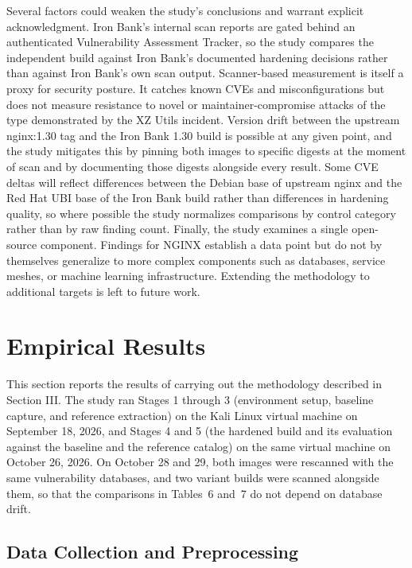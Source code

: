 \documentclass[10pt,letterpaper,twocolumn]{article}
\begin{document}
Several factors could weaken the study's conclusions and warrant explicit acknowledgment. Iron Bank's internal scan reports are gated behind an authenticated Vulnerability Assessment Tracker, so the study compares the independent build against Iron Bank's documented hardening decisions rather than against Iron Bank's own scan output. Scanner-based measurement is itself a proxy for security posture. It catches known CVEs and misconfigurations but does not measure resistance to novel or maintainer-compromise attacks of the type demonstrated by the XZ Utils incident. Version drift between the upstream nginx:1.30 tag and the Iron Bank 1.30 build is possible at any given point, and the study mitigates this by pinning both images to specific digests at the moment of scan and by documenting those digests alongside every result. Some CVE deltas will reflect differences between the Debian base of upstream nginx and the Red Hat UBI base of the Iron Bank build rather than differences in hardening quality, so where possible the study normalizes comparisons by control category rather than by raw finding count. Finally, the study examines a single open-source component. Findings for NGINX establish a data point but do not by themselves generalize to more complex components such as databases, service meshes, or machine learning infrastructure. Extending the methodology to additional targets is left to future work.

\section{Empirical Results}

This section reports the results of carrying out the methodology described in Section III. The study ran Stages 1 through 3 (environment setup, baseline capture, and reference extraction) on the Kali Linux virtual machine on September 18, 2026, and Stages 4 and 5 (the hardened build and its evaluation against the baseline and the reference catalog) on the same virtual machine on October 26, 2026. On October 28 and 29, both images were rescanned with the same vulnerability databases, and two variant builds were scanned alongside them, so that the comparisons in Tables~6 and~7 do not depend on database drift.

\subsection{Data Collection and Preprocessing}
\end{document}
